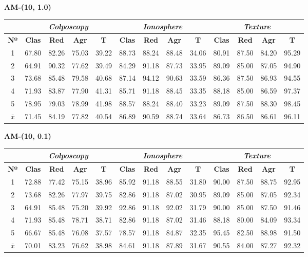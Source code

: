 \documentclass[12pt]{article}
\begin{document}
\textbf{AM-(10, 1.0)}

\begin{table}[h!]
\begin{tabular}{ccccc|cccc|cccc}
 & \multicolumn{4}{c}{\textit{Colposcopy}} & \multicolumn{4}{c}{\textit{Ionosphere}} & \multicolumn{4}{c}{\textit{Texture}} \\ \hline
\textbf{Nº} & \textbf{Clas} & \textbf{Red} & \textbf{Agr} & \textbf{T} & \textbf{Clas} & \textbf{Red} & \textbf{Agr} & \textbf{T} & \textbf{Clas} & \textbf{Red} & \textbf{Agr} & \textbf{T} \\ \hline
1 & 67.80 & 82.26 & 75.03 & 39.22 & 88.73 & 88.24 & 88.48 & 34.06 & 80.91 & 87.50 & 84.20 & 95.29 \\
2 & 64.91 & 90.32 & 77.62 & 39.49 & 84.29 & 91.18 & 87.73 & 33.95 & 89.09 & 85.00 & 87.05 & 94.90 \\
3 & 73.68 & 85.48 & 79.58 & 40.68 & 87.14 & 94.12 & 90.63 & 33.59 & 86.36 & 87.50 & 86.93 & 94.55 \\
4 & 71.93 & 83.87 & 77.90 & 41.31 & 85.71 & 91.18 & 88.45 & 33.35 & 88.18 & 85.00 & 86.59 & 97.37 \\
5 & 78.95 & 79.03 & 78.99 & 41.98 & 88.57 & 88.24 & 88.40 & 33.23 & 89.09 & 87.50 & 88.30 & 98.45 \\
\hline
$\bar{x}$ & 71.45 & 84.19 & 77.82 & 40.54 & 86.89 & 90.59 & 88.74 & 33.64 & 86.73 & 86.50 & 86.61 & 96.11 \\
\end{tabular}
\end{table}


\textbf{AM-(10, 0.1)}

\begin{table}[h!]
\begin{tabular}{ccccc|cccc|cccc}
 & \multicolumn{4}{c}{\textit{Colposcopy}} & \multicolumn{4}{c}{\textit{Ionosphere}} & \multicolumn{4}{c}{\textit{Texture}} \\ \hline
\textbf{Nº} & \textbf{Clas} & \textbf{Red} & \textbf{Agr} & \textbf{T} & \textbf{Clas} & \textbf{Red} & \textbf{Agr} & \textbf{T} & \textbf{Clas} & \textbf{Red} & \textbf{Agr} & \textbf{T} \\ \hline
1 & 72.88 & 77.42 & 75.15 & 38.96 & 85.92 & 91.18 & 88.55 & 31.80 & 90.00 & 87.50 & 88.75 & 92.95 \\
2 & 73.68 & 82.26 & 77.97 & 39.75 & 82.86 & 91.18 & 87.02 & 30.95 & 89.09 & 85.00 & 87.05 & 92.34 \\
3 & 64.91 & 85.48 & 75.20 & 39.92 & 92.86 & 91.18 & 92.02 & 31.79 & 90.00 & 85.00 & 87.50 & 91.46 \\
4 & 71.93 & 85.48 & 78.71 & 38.71 & 82.86 & 91.18 & 87.02 & 31.46 & 88.18 & 80.00 & 84.09 & 93.34 \\
5 & 66.67 & 85.48 & 76.08 & 37.57 & 78.57 & 91.18 & 84.87 & 32.35 & 95.45 & 82.50 & 88.98 & 91.50 \\
\hline
$\bar{x}$ & 70.01 & 83.23 & 76.62 & 38.98 & 84.61 & 91.18 & 87.89 & 31.67 & 90.55 & 84.00 & 87.27 & 92.32 \\
\end{tabular}
\end{table}
\end{document}
